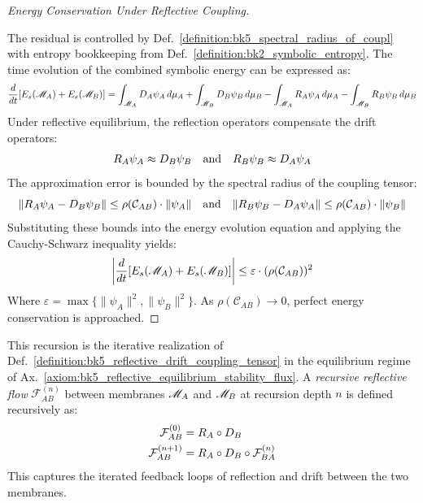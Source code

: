 \begin{proof}[Energy Conservation Under Reflective Coupling]
\label{proof:bk5_energy_conservation_under_reflective_coupling}
\leavevmode

The residual is controlled by Def.~\ref{definition:bk5_spectral_radius_of_coupl} with entropy bookkeeping from Def.~\ref{definition:bk2_symbolic_entropy}.
The time evolution of the combined symbolic energy can be expressed as:
\begin{equation}
\frac{d}{dt}[E_s(\mathscr{M}_A) + E_s(\mathscr{M}_B)] = \int_{\mathscr{M}_A} D_A\psi_A\,d\mu_A + \int_{\mathscr{M}_B} D_B\psi_B\,d\mu_B - \int_{\mathscr{M}_A} R_A\psi_A\,d\mu_A - \int_{\mathscr{M}_B} R_B\psi_B\,d\mu_B
\end{equation}
Under reflective equilibrium, the reflection operators compensate the drift operators:
\begin{equation}
R_A\psi_A \approx D_B\psi_B \quad \text{and} \quad R_B\psi_B \approx D_A\psi_A
\end{equation}
The approximation error is bounded by the spectral radius of the coupling tensor:
\begin{equation}
\|R_A\psi_A - D_B\psi_B\| \leq \rho(\mathcal{C}_{AB}) \cdot \|\psi_A\| \quad \text{and} \quad \|R_B\psi_B - D_A\psi_A\| \leq \rho(\mathcal{C}_{AB}) \cdot \|\psi_B\|
\end{equation}
Substituting these bounds into the energy evolution equation and applying the Cauchy-Schwarz inequality yields:
\begin{equation}
\left| \frac{d}{dt}[E_s(\mathscr{M}_A) + E_s(\mathscr{M}_B)] \right| \leq \varepsilon \cdot (\rho(\mathcal{C}_{AB}))^2
\end{equation}
Where $\varepsilon = \max\{\|\psi_A\|^2, \|\psi_B\|^2\}$. As $\rho(\mathcal{C}_{AB}) \to 0$, perfect energy conservation is approached.
\end{proof}
\begin{definition} \label{definition:bk5_recursive_reflective_flow}
This recursion is the iterative realization of Def.~\ref{definition:bk5_reflective_drift_coupling_tensor} in the equilibrium regime of Ax.~\ref{axiom:bk5_reflective_equilibrium_stability_flux}.
A \emph{recursive reflective flow} $\mathcal{F}_{AB}^{(n)}$ between membranes $\mathscr{M}_A$ and $\mathscr{M}_B$ at recursion depth $n$ is defined recursively as:
\begin{align}
\mathcal{F}_{AB}^{(0)} &= R_A \circ D_B\\
\mathcal{F}_{AB}^{(n+1)} &= R_A \circ D_B \circ \mathcal{F}_{BA}^{(n)}
\end{align}
This captures the iterated feedback loops of reflection and drift between the two membranes.
\end{definition}

